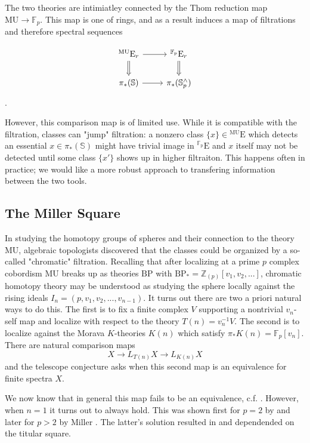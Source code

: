 \documentclass[10pt]{amsart}
\theoremstyle{definition}
\numberwithin{figure}{section}
\numberwithin{equation}{section}
\newcommand{\MU}{\mathrm{MU}}
\newcommand{\BP}{\mathrm{BP}}
\newcommand{\genanss}[1]{{}^{\mathrm{#1}}\mathrm{E}}
\theoremstyle{cited}
\newcommand{\bZ}{\mathbb{Z}}
\newcommand{\bS}{\mathbb{S}}
\newcommand{\bF}{\mathbb{F}}
\begin{document}
The two theories are intimiatley connected by the Thom reduction map $\MU\to \bF_p$. This map is one of rings, and as a result induces a map of filtrations and therefore spectral sequences

\[\begin{tikzcd}
	{\genanss{\MU}_r} & {\genanss{\bF_p}_r} \\
	{\pi_*(\bS)} & {\pi_*(\bS^\wedge_p)}
	\arrow[from=1-1, to=1-2]
	\arrow[Rightarrow, from=1-1, to=2-1]
	\arrow[Rightarrow, from=1-2, to=2-2]
	\arrow[from=2-1, to=2-2]
\end{tikzcd}\].

However, this comparison map is of limited use. While it is compatible with the filtration, classes can "jump" filtration: a nonzero class $\{x\}\in \genanss{\MU}$ which detects an essential $x\in \pi_*(\bS)$ might have trivial image in $\genanss{\bF_p}$ and $x$ itself may not be detected until some class $\{x'\}$ shows up in higher filtraiton. This happens often in practice; we would like a more robust approach to transfering information between the two tools.

\subsection{The Miller Square}

In studying the homotopy groups of spheres and their connection to the theory $\MU$, algebraic topologists discovered that the classes could be organized by a so-called "chromatic" filtration. Recalling that after localizing at a prime $p$ complex cobordism $\MU$ breaks up as theories $\BP$ with $\BP_*=\bZ_{(p)}[v_1,v_2,...]$, chromatic homotopy theory may be understood as studying the sphere locally against the rising ideals $I_n=(p,v_1,v_2,...,v_{n-1})$. It turns out there are two a priori natural ways to do this. The first is to fix a finite complex $V$ supporting a nontrivial $v_n$-self map and localize with respect to the theory $T(n)=v_n^{-1}V$. The second is to localize against the Morava $K$-theories $K(n)$ which satisfy $\pi_*K(n)=\bF_p[v_n]$. There are natural comparison maps
\[
  X\to L_{T(n)}X\to L_{K(n)}X
\]
and the telescope conjecture asks when this second map is an equivalence for finite spectra $X$.

We now know that in general this map fails to be an equivalence, c.f. \cite{todo}. However, when $n=1$ it turns out to always hold. This was shown first for $p=2$ by \cite{todo} and later for $p>2$ by Miller \cite{todo}. The latter's solution resulted in and dependended on the titular square.
\end{document}
